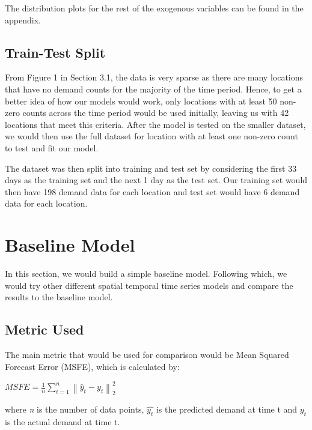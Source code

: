 \documentclass[12pt, letterpaper] {article}
\begin{document}
\noindent The distribution plots for the rest of the exogenous variables can be found in the appendix. 


\subsection{Train-Test Split}
From Figure 1 in Section 3.1, the data is very sparse as there are many locations that have no demand counts for the majority of the time period. Hence, to get a better idea of how our models would work, only locations with at least 50 non-zero counts across the time period would be used initially, leaving us with 42 locations that meet this criteria. After the model is tested on the smaller dataset, we would then use the full dataset for location with at least one non-zero count to test and fit our model. 

\noindent The dataset was then split into training and test set by considering the first 33 days as the training set and the next 1 day as the test set. Our training set would then have 198 demand data for each location and test set would have 6 demand data for each location. 

\section{Baseline Model}
In this section, we would build a simple baseline model. Following which, we would try other different spatial temporal time series models and compare the results to the baseline model. 

\subsection{Metric Used}
The main metric that would be used for comparison would be Mean Squared Forecast Error (MSFE), which is calculated by:

\begin{center}
    $\displaystyle MSFE=\frac{1}{n}\sum_{t=1}^{n}\left \| \hat{y}_{t} - y_{t} \right \|_{2}^{2}$
\end{center}
where \textit{n} is the number of data points, $\hat{y_t}$ is the predicted demand at time t and ${y_t}$ is the actual demand at time t.
\end{document}
